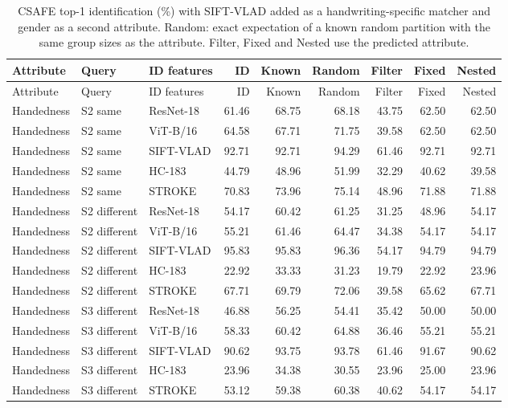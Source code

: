 \documentclass[10pt,a4paper]{article}
\begin{document}
\begin{longtable}{lllrrrrrr}
\caption{CSAFE top-1 identification (\%) with SIFT-VLAD added as a handwriting-specific matcher and gender as a second attribute. Random: exact expectation of a known random partition with the same group sizes as the attribute. Filter, Fixed and Nested use the predicted attribute.}\label{tab:p2ident}\\
\toprule Attribute & Query & ID features & ID & Known & Random & Filter & Fixed & Nested\\\midrule
\endfirsthead
\toprule Attribute & Query & ID features & ID & Known & Random & Filter & Fixed & Nested\\\midrule
\endhead
Handedness & S2 same & ResNet-18 & 61.46 & 68.75 & 68.18 & 43.75 & 62.50 & 62.50 \\
Handedness & S2 same & ViT-B/16 & 64.58 & 67.71 & 71.75 & 39.58 & 62.50 & 62.50 \\
Handedness & S2 same & SIFT-VLAD & 92.71 & 92.71 & 94.29 & 61.46 & 92.71 & 92.71 \\
Handedness & S2 same & HC-183 & 44.79 & 48.96 & 51.99 & 32.29 & 40.62 & 39.58 \\
Handedness & S2 same & STROKE & 70.83 & 73.96 & 75.14 & 48.96 & 71.88 & 71.88 \\
Handedness & S2 different & ResNet-18 & 54.17 & 60.42 & 61.25 & 31.25 & 48.96 & 54.17 \\
Handedness & S2 different & ViT-B/16 & 55.21 & 61.46 & 64.47 & 34.38 & 54.17 & 54.17 \\
Handedness & S2 different & SIFT-VLAD & 95.83 & 95.83 & 96.36 & 54.17 & 94.79 & 94.79 \\
Handedness & S2 different & HC-183 & 22.92 & 33.33 & 31.23 & 19.79 & 22.92 & 23.96 \\
Handedness & S2 different & STROKE & 67.71 & 69.79 & 72.06 & 39.58 & 65.62 & 67.71 \\
Handedness & S3 different & ResNet-18 & 46.88 & 56.25 & 54.41 & 35.42 & 50.00 & 50.00 \\
Handedness & S3 different & ViT-B/16 & 58.33 & 60.42 & 64.88 & 36.46 & 55.21 & 55.21 \\
Handedness & S3 different & SIFT-VLAD & 90.62 & 93.75 & 93.78 & 61.46 & 91.67 & 90.62 \\
Handedness & S3 different & HC-183 & 23.96 & 34.38 & 30.55 & 23.96 & 25.00 & 23.96 \\
Handedness & S3 different & STROKE & 53.12 & 59.38 & 60.38 & 40.62 & 54.17 & 54.17 \\

\end{longtable}
\end{document}
